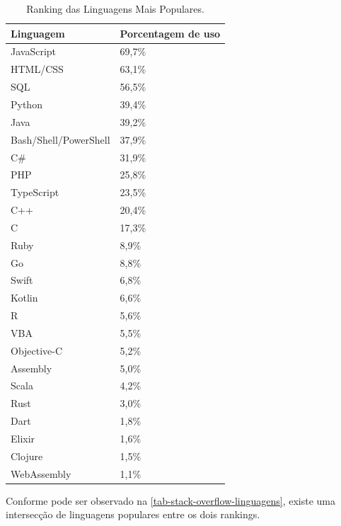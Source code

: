 
\begin{table}[htb]
\ABNTEXfontereduzida
\caption[Ranking das Linguagens Mais Populares]{Ranking das Linguagens Mais Populares.}
\label{tab-stack-overflow-linguagens}
\begin{tabular}{p{5cm}|p{4cm}}
   \textbf{Linguagem} & \textbf{Porcentagem de uso}  \\
    \hline
    JavaScript & 69,7\%  \\
    \hline
    HTML/CSS & 63,1\%  \\
    \hline
    SQL & 56,5\%  \\
    \hline
    Python & 39,4\%  \\
    \hline
    Java & 39,2\%  \\
    \hline
    Bash/Shell/PowerShell & 37,9\%  \\
    \hline
    C\# & 31,9\%  \\
    \hline
    PHP & 25,8\%  \\
    \hline
    TypeScript & 23,5\%  \\
    \hline
    C++ & 20,4\%  \\
    \hline
    C & 17,3\%  \\
    \hline
    Ruby & 8,9\%  \\
    \hline
    Go & 8,8\%  \\
    \hline
    Swift & 6,8\%  \\
    \hline
    Kotlin & 6,6\%  \\
    \hline
    R & 5,6\%  \\
    \hline
    VBA & 5,5\%  \\
    \hline
    Objective-C & 5,2\%  \\
    \hline
    Assembly & 5,0\%  \\
    \hline
    Scala & 4,2\%  \\
    \hline
    Rust & 3,0\%  \\
    \hline
    Dart & 1,8\%  \\
    \hline
    Elixir & 1,6\%  \\
    \hline
    Clojure & 1,5\%  \\
    \hline
    WebAssembly & 1,1\%  \\
\end{tabular}
\end{table}

\newpage
Conforme pode ser observado na \autoref{tab-stack-overflow-linguagens}, existe uma intersecção de linguagens populares entre os dois rankings.

